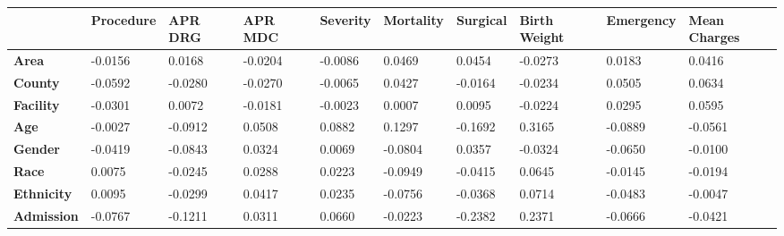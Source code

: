 \documentclass[10pt,twocolumn,letterpaper]{article}
\begin{document}
\begin{landscape}
\begin{table}[]
\begin{tabular}{|l|l|l|l|l|l|l|l|l|l|}
\hline
                      & \textbf{Procedure} & \textbf{APR DRG} & \textbf{APR MDC} & \textbf{Severity} & \textbf{Mortality} & \textbf{Surgical} & \textbf{Birth Weight} & \textbf{Emergency} & \textbf{Mean Charges} \\ \hline
\textbf{Area}         & -0.0156            & 0.0168           & -0.0204          & -0.0086           & 0.0469             & 0.0454            & -0.0273               & 0.0183             & 0.0416                \\ \hline
\textbf{County}       & -0.0592            & -0.0280          & -0.0270          & -0.0065           & 0.0427             & -0.0164           & -0.0234               & 0.0505             & 0.0634                \\ \hline
\textbf{Facility}     & -0.0301            & 0.0072           & -0.0181          & -0.0023           & 0.0007             & 0.0095            & -0.0224               & 0.0295             & 0.0595                \\ \hline
\textbf{Age}          & -0.0027            & -0.0912          & 0.0508           & 0.0882            & 0.1297             & -0.1692           & 0.3165                & -0.0889            & -0.0561               \\ \hline
\textbf{Gender}       & -0.0419            & -0.0843          & 0.0324           & 0.0069            & -0.0804            & 0.0357            & -0.0324               & -0.0650            & -0.0100               \\ \hline
\textbf{Race}         & 0.0075             & -0.0245          & 0.0288           & 0.0223            & -0.0949            & -0.0415           & 0.0645                & -0.0145            & -0.0194               \\ \hline
\textbf{Ethnicity}    & 0.0095             & -0.0299          & 0.0417           & 0.0235            & -0.0756            & -0.0368           & 0.0714                & -0.0483            & -0.0047               \\ \hline
\textbf{Admission}    & -0.0767            & -0.1211          & 0.0311           & 0.0660            & -0.0223            & -0.2382           & 0.2371                & -0.0666            & -0.0421               \\ \hline

\end{tabular}
\end{table}
\end{landscape}
\end{document}
